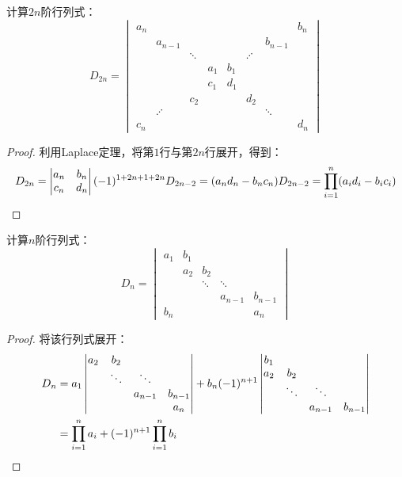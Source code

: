 \begin{theorem}
	计算$2n$阶行列式：
	\begin{equation*}
		D_{2n}=
		\begin{vmatrix}
			a_n & & & & & & & b_n \\
			& a_{n-1} & & & & & b_{n-1}& \\
			& & \ddots & & & \iddots & & \\ 
			& & & a_1 & b_1 & & & \\ 
			& & & c_1 & d_1 & & & \\ 
			& & c_2 & & & d_2 & & \\ 
			& \iddots & & & & & \ddots & \\ 
			c_n & & & & & & & d_n
		\end{vmatrix}
	\end{equation*}
\end{theorem}
\begin{proof}
	利用Laplace定理，将第$1$行与第$2n$行展开，得到：
	\begin{equation*}
		D_{2n}=
		\begin{vmatrix}
			a_n & b_n \\
			c_n & d_n
		\end{vmatrix}
		(-1)^{1+2n+1+2n}D_{2n-2}
		=(a_nd_n-b_nc_n)D_{2n-2}=\prod_{i=1}^n(a_id_i-b_ic_i)\qedhere
	\end{equation*}
\end{proof}

\begin{theorem}
	计算$n$阶行列式：
	\begin{equation*}
		D_{n}=
		\begin{vmatrix}
			a_1 & b_1 & & & \\
			& a_2 & b_2 & & \\
			& & \ddots & \ddots & \\
			& & & a_{n-1} & b_{n-1} \\
			b_n & & & & a_n
		\end{vmatrix}
	\end{equation*}
\end{theorem}
\begin{proof}
	将该行列式展开：
	\begin{align*}
		D_n
		&=a_1
		\begin{vmatrix}
			a_2 & b_2 & & \\
			& \ddots & \ddots & \\
			& & a_{n-1} & b_{n-1} \\
		 	& & & a_n
		\end{vmatrix}
		+b_n(-1)^{n+1}
		\begin{vmatrix}
			b_1 & & & \\
			a_2 & b_2 & & \\
			& \ddots & \ddots & \\
			& & a_{n-1} & b_{n-1}
		\end{vmatrix} \\
		&=\prod_{i=1}^na_i+(-1)^{n+1}\prod_{i=1}^nb_i\qedhere
	\end{align*}
\end{proof}

